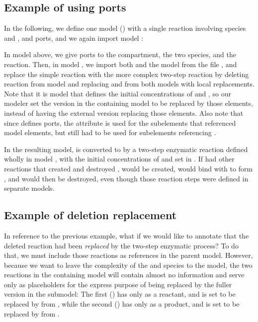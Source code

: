 \subsection{Example of using ports}

In the following, we define one model () with a single
reaction involving species  and , and ports, and we
again import model :


In model  above, we give ports to the compartment, the two
species, and the reaction.  Then, in model , we import
both  and the model  from the file
, and replace the simple reaction with the more
complex two-step reaction by deleting reaction  from model
 and replacing  and  from both models with
local replacements.  Note that it is model  that defines the
initial concentrations of  and , so our modeler set the 
version in the containing model to be replaced by those elements, instead of 
having the external version replacing those elements.  Also note that since
 defines ports, the  attribute is used for the
subelements that referenced  model elements, but
 still had to be used for subelements referencing
.

In the resulting model,  is converted to  by a two-step
enzymatic reaction defined wholly in model , with the
initial concentrations of  and  set in
.  If  had other reactions that created
 and destroyed ,  would be created, would bind with
 to form , and  would then be destroyed, even
though those reaction steps were defined in separate models.


\subsection{Example of deletion replacement}

In reference to the previous example, what if we would like to annotate
that the deleted reaction had been \emph{replaced} by the two-step
enzymatic process?  To do that, we must include those reactions as 
references in the parent model.  However, because we want to leave the complexity of the 
 and  species to the  model,
the two reactions in the containing model will contain almost no information
and serve only as placeholders for the express purpose of being replaced by
the fuller version in the  submodel:  The first () has
only  as a reactant, and is set to be replaced by  from
, while the second () has only  as a 
product, and is set to be replaced by  from .

